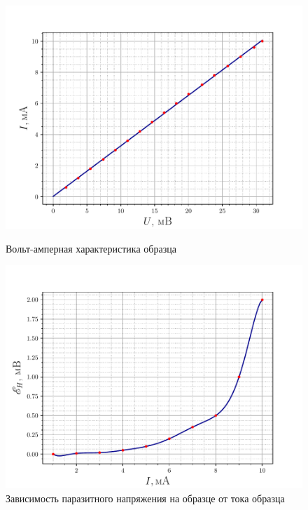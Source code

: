 \begin{figure}[h!]
\begin{minipage}[h]{0.49\linewidth}
	\centering
	\includegraphics[width=\linewidth]{fig/52.pdf}
	\caption{Вольт-амперная характеристика образца}
	\label{fig:5.2}
\end{minipage}
\hfill
\begin{minipage}[h]{0.49\linewidth}
	\centering
	\includegraphics[width=\linewidth]{fig/53.pdf}
	\caption{Зависимость паразитного напряжения на образце от тока образца}
	\label{fig:5.3}
\end{minipage}
\end{figure}



